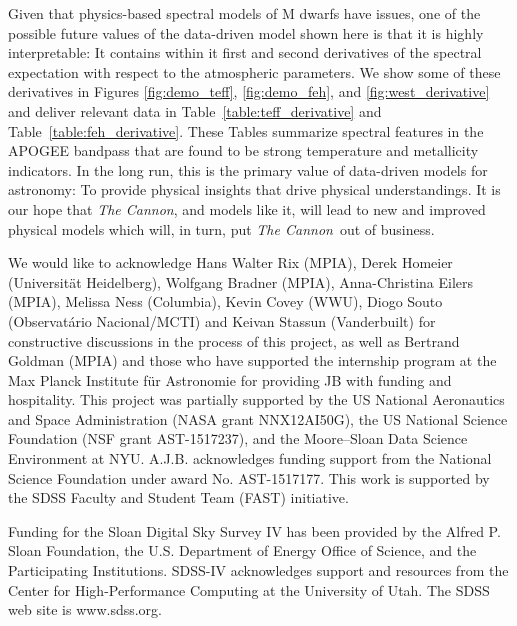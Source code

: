 \documentclass[twocolumn]{aastex62}
\newcommand{\thecannon}{\textsl{The Cannon}}
\begin{document}
Given that physics-based spectral models of M dwarfs have issues, one of the possible
future values of the data-driven model shown here is that it is highly interpretable:
It contains within it first and second derivatives of the spectral expectation with
respect to the atmospheric parameters.
We show some of these derivatives in Figures \ref{fig:demo_teff}, \ref{fig:demo_feh}, and \ref{fig:west_derivative} and deliver relevant data in
Table~\ref{table:teff_derivative} and Table~\ref{table:feh_derivative}.
These Tables summarize spectral features in the APOGEE bandpass
that are found to be strong temperature and metallicity indicators.
In the long run, this is the primary value of data-driven models for astronomy:
To provide physical insights that drive physical understandings.
It is our hope that \thecannon, and models like it, will lead to
new and improved physical models which will, in turn, put \thecannon\ out of business. 

\acknowledgements
We would like to acknowledge Hans Walter Rix (MPIA), Derek Homeier (Universit{\"a}t Heidelberg), Wolfgang Bradner (MPIA), Anna-Christina Eilers (MPIA), Melissa Ness (Columbia), Kevin Covey (WWU), Diogo Souto (Observatário Nacional/MCTI) and Keivan Stassun (Vanderbuilt) for constructive discussions in the process of this project, as well as Bertrand Goldman (MPIA) and those who have supported the internship program at the Max Planck Institute f{\"u}r Astronomie for providing JB with funding and hospitality.
This project was partially supported by
the US National Aeronautics and Space Administration (NASA grant NNX12AI50G),
the US National Science Foundation (NSF grant AST-1517237),
and the Moore--Sloan Data Science Environment at NYU.
A.J.B. acknowledges funding support from the National Science Foundation under award No. AST-1517177.
This work is supported by the SDSS Faculty and Student Team (FAST) initiative.

Funding for the Sloan Digital Sky Survey IV has been provided by the Alfred P. Sloan Foundation, the U.S. Department of Energy Office of Science, and the Participating Institutions. SDSS-IV acknowledges support and resources from the Center for High-Performance Computing at
the University of Utah. The SDSS web site is www.sdss.org.
\end{document}
